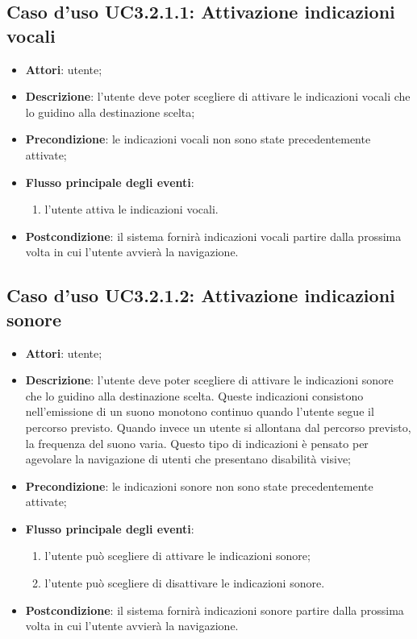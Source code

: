 \documentclass[../AnalisiDeiRequisiti.tex]{subfiles}
\begin{document}
\subsection{Caso d'uso UC3.2.1.1: Attivazione indicazioni vocali}
\begin{itemize}
	\item \textbf{Attori}: utente;
	\item \textbf{Descrizione}: l'utente deve poter scegliere di attivare le indicazioni vocali che lo guidino alla destinazione scelta; 
	\item \textbf{Precondizione}: le indicazioni vocali non sono state precedentemente attivate;
	
	\item \textbf{Flusso principale degli eventi}:
	\begin{enumerate}
		\item l'utente attiva le indicazioni vocali.
		
	\end{enumerate}
	\item \textbf{Postcondizione}: il sistema fornirà indicazioni vocali partire dalla prossima volta in cui l'utente avvierà la navigazione.
\end{itemize}
\hypertarget{UC3.2.1.2}{}
\subsection{Caso d'uso UC3.2.1.2: Attivazione indicazioni sonore}
\begin{itemize}
	\item \textbf{Attori}: utente;
	\item \textbf{Descrizione}: l'utente deve poter scegliere di attivare le indicazioni sonore che lo guidino alla destinazione scelta. Queste indicazioni consistono nell'emissione di un suono monotono continuo quando l'utente segue il percorso previsto. Quando invece un utente si allontana dal percorso previsto, la frequenza del suono varia. Questo tipo di indicazioni è pensato per agevolare la navigazione di utenti che presentano disabilità visive; 
	\item \textbf{Precondizione}: le indicazioni sonore non sono state precedentemente attivate;
	
	\item \textbf{Flusso principale degli eventi}:
	\begin{enumerate}
		\item l'utente può scegliere di attivare le indicazioni sonore;
		\item l'utente può scegliere di disattivare le indicazioni sonore.
		
	\end{enumerate}
	\item \textbf{Postcondizione}: il sistema fornirà indicazioni sonore partire dalla prossima volta in cui l'utente avvierà la navigazione.
\end{itemize}
\hypertarget{UC3.2.1.3}{}
\end{document}
